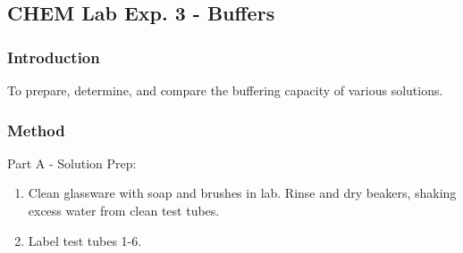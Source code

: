 \documentclass{article}  %
\begin{document}
\subsection*{CHEM Lab Exp. 3 - Buffers}
\subsubsection*{Introduction} 
To prepare, determine, and compare the buffering capacity of various solutions.
\subsubsection*{Method}
Part A - Solution Prep:
\begin{enumerate}
    \item Clean glassware with soap and brushes in lab. Rinse and dry beakers, shaking excess water from clean test tubes.
    \item Label test tubes 1-6.
\end{enumerate}
\end{document}
